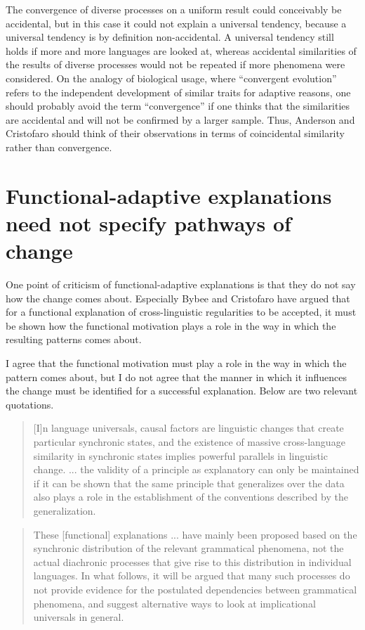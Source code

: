 \documentclass[output=paper]{langsci/langscibook}
\begin{document}
The convergence of diverse processes on a uniform result could conceivably be accidental, but in this case it could not explain a universal tendency, because a universal tendency is by definition non-accidental. A universal tendency still holds if more and more languages are looked at, whereas accidental similarities of the results of diverse processes would not be repeated if more phenomena were considered. On the analogy of biological usage, where “convergent evolution” refers to the independent development of similar traits for adaptive reasons, one should probably avoid the term “convergence” if one thinks that the similarities are accidental and will not be confirmed by a larger sample. Thus, Anderson and Cristofaro should think of their observations in terms of coincidental similarity rather than convergence.

\section{Functional-adaptive explanations need not specify pathways of change}\label{sec:haspelmath:6}

One point of criticism of functional-adaptive explanations is that they do not say how the change comes about. Especially Bybee and Cristofaro have argued that for a functional explanation of cross-linguistic regularities to be accepted, it must be shown how the functional motivation plays a role in the way in which the resulting patterns comes about.

I agree that the functional motivation must play a role in the way in which the pattern comes about, but I do not agree that the manner in which it influences the change must be identified for a successful explanation. Below are two relevant quotations.

\begin{quote}
[I]n language universals, causal factors are linguistic changes that create particular synchronic states, and the existence of massive cross-language similarity in synchronic states implies powerful parallels in linguistic change. ... the validity of a principle as explanatory can only be maintained if it can be shown that the same principle that generalizes over the data also plays a role in the establishment of the conventions described by the generalization. \citep[352]{Bybee1988}
\end{quote}

\begin{quote}
These [functional] explanations ... have mainly been proposed based on the synchronic distribution of the relevant grammatical phenomena, not the actual diachronic processes that give rise to this distribution in individual languages. In what follows, it will be argued that many such processes do not provide evidence for the postulated dependencies between grammatical phenomena, and suggest alternative ways to look at implicational universals in general. \citep[10]{Cristofaro2017}
\end{quote}
\end{document}
